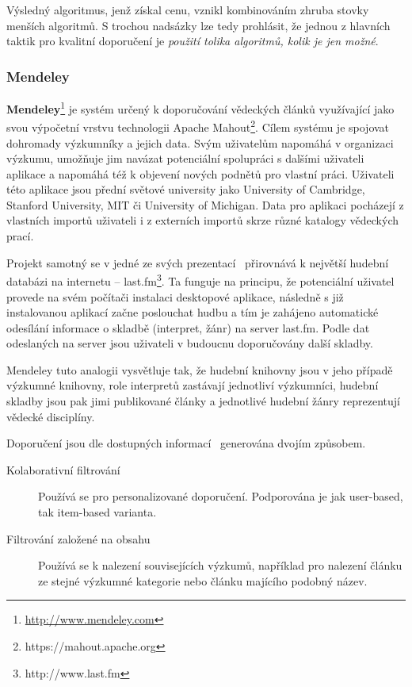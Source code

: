 \documentclass[thesis=M,czech]{FITthesis}[2014/05/07]
\begin{document}
Výsledný algoritmus, jenž získal cenu, vznikl kombinováním zhruba stovky menších algoritmů. S trochou nadsázky lze tedy prohlásit, že jednou z hlavních taktik pro kvalitní doporučení je \emph{použití tolika algoritmů, kolik je jen možné}.

\subsubsection{Mendeley}	
\label{mendeley}
\textbf{Mendeley}\footnote{\url{http://www.mendeley.com}} je systém určený k doporučování vědeckých článků využívající jako svou výpočetní vrstvu technologii Apache Mahout\footnote{https://mahout.apache.org}. Cílem systému je spojovat dohromady výzkumníky a jejich data. Svým uživatelům napomáhá v organizaci výzkumu, umožňuje jim navázat potenciální spolupráci s dalšími uživateli aplikace a napomáhá též k objevení nových podnětů pro vlastní práci. Uživateli této aplikace jsou přední světové university jako University of Cambridge, Stanford University, MIT či University of Michigan. Data pro aplikaci pocházejí z vlastních importů uživateli i z externích importů skrze různé katalogy vědeckých prací. 

Projekt samotný se v jedné ze svých prezentací~\cite{mendeleylastfm} přirovnává k největší hudební databázi na internetu – last.fm\footnote{http://www.last.fm}. Ta funguje na principu, že potenciální uživatel provede na svém počítači instalaci desktopové aplikace, následně s již instalovanou aplikací začne poslouchat hudbu a tím je zahájeno automatické odesílání informace o skladbě (interpret, žánr) na server last.fm. Podle dat odeslaných na server jsou uživateli v budoucnu doporučovány další skladby. 

Mendeley tuto analogii vysvětluje tak, že hudební knihovny jsou v jeho případě výzkumné knihovny, role interpretů zastávají jednotliví výzkumníci, hudební skladby jsou pak jimi publikované články a jednotlivé hudební žánry reprezentují vědecké disciplíny.  

Doporučení jsou dle dostupných informací~\cite{mendeleylastfm} generována dvojím způsobem. 

\begin{description}
	\item[Kolaborativní filtrování] Používá se pro personalizované doporučení. Podporována je jak user-based, tak item-based varianta.
	\item[Filtrování založené na obsahu] Používá se k nalezení souvisejících výzkumů, například pro nalezení článku ze stejné výzkumné kategorie nebo článku majícího podobný název. 
\end{description}
\end{document}
